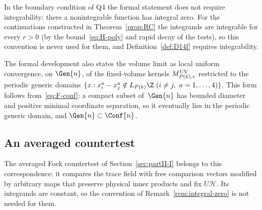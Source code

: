 \begin{remark}\label{rem:integral-zero}
In the boundary condition of Q4 the formal statement does not require integrability: there a nonintegrable function has integral zero. For the continuations constructed in Theorem~\ref{prop:RC} the integrands are integrable for every $r>0$ (by the bound~\eqref{eq:H-poly} and rapid decay of the tests), so this convention is never used for them, and Definition~\ref{def:D14f} requires integrability.
\end{remark}

The formal development also states the volume limit as local uniform convergence, on $\Gen{n}$, of the fixed-volume kernels $M^{\rm UV}_{P(k),v}$ restricted to the periodic generic domains $\{x:x_i^a-x_j^a\notin L_{P(k)}\Z\ (i\ne j,\ a=1,\ldots,4)\}$. This form follows from~\eqref{eq:F-conf}: a compact subset of~$\Gen{n}$ has bounded diameter and positive minimal coordinate separation, so it eventually lies in the periodic generic domain, and $\Gen{n}\subset\Conf{n}$.

\subsection{An averaged countertest}\label{sec:averaged-countertest}

The averaged Fock countertest of Section~\ref{sec:partII-I} belongs to this correspondence: it compares the trace field with free comparison vectors modified by arbitrary maps that preserve physical inner products and fix $U\mathcal H$. Its integrands are constant, so the convention of Remark~\ref{rem:integral-zero} is not needed for them.

